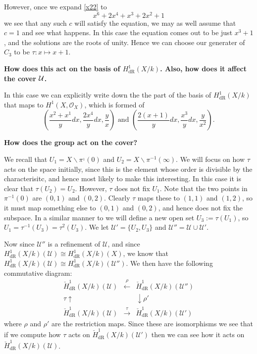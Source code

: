 \documentclass[draft, 11pt]{article} %
\theoremstyle{plain}
\theoremstyle{remark}
\newcommand{\cU}{{\mathcal U}}
\newcommand{\hone}{H^1(X,\mathcal{O}_X)}
\newcommand{\derhamhone}{H_{\text {dR}}^1(X/k)}
\newcommand{\cechderhamhone}{\check{H}_{\text {dR}}^1(X/k)}
\begin{document}
However, once we expand \eqref{x22} to 
\begin{equation}
x^6 + 2x^4 + x^3 + 2x^2 + 1
\end{equation}
we see that any such $c$ will satisfy the equation, we may as well assume that $c=1$ and see what happens.
In this case the equation comes out to be just $x^3+1$, and the solutions are the roots of unity.
Hence we can choose our generater of $C_3$ to be $\tau \colon x \mapsto x+1$.


{\bf How does this act on the basis of $\derhamhone$. Also, how does it affect the cover $\cal U$.}

In this case we can explicitly write down the the part of the basis of $\derhamhone$ that maps to $\hone$, which is formed of
\[
\left( \frac{x^2+x^1}{y} dx, \frac{2x^4}{y} dx, \frac{y}{x} \right) \text{ and } \left( \frac{2(x + 1)}{y} dx, \frac{x^3}{y} dx, \frac{y}{x^2} \right).
\]

{\bf How does the group act on the cover?}

We recall that $U_1 = X \backslash \pi^{_1}(0)$ and $U_2 = X \backslash \pi^{-1}(\infty)$.
We will focus on how $\tau$ acts on the space initially, since this is the element whose order is divisible by the characterisitc, and hence most likely to make this interesting.
In this case it is clear that $\tau(U_2) = U_2$.
However, $\tau$ does not fix $U_1$. 
Note that the two points in $\pi^{-1}(0)$ are $(0,1)$ and $(0,2)$.
Clearly $\tau$ maps these to $(1,1)$ and $(1,2)$, so it must map something else to $(0,1)$ and $(0,2)$, and hence does not fix the subspace.
In a similar manner to \cite{canonicalrepresentation} we will define a new open set $U_3 := \tau(U_1)$, so $U_1 = \tau^{-1}(U_3) = \tau^2(U_3)$.
We let $\mathcal U' = \{ U_2, U_3\}$ and $\mathcal U'' = \mathcal U \cup \mathcal U'$.

Now since $\mathcal U''$ is a refinement of $\mathcal U$, and since $\derhamhone (\mathcal U) \cong \derhamhone (X)$, we know that $\derhamhone (\mathcal U) \cong \derhamhone (\cU'')$.
We then have the following commutative diagram:
\[
\begin{array}{ccc}
\cechderhamhone (\cU) & \overset{\rho}{\leftarrow} & \cechderhamhone (\cU'') \\
\tau \uparrow & & \downarrow  \rho' \\
\cechderhamhone(\cU) & \overset{\tau}{\rightarrow} & \cechderhamhone(\cU')
\end{array}
\]
where $\rho$ and $\rho'$ are the restriction maps.
Since these are isomorphisms we see that if we compute how $\tau$ acts on $\cechderhamhone (\cU')$ then we can see how it acts on $\cechderhamhone(\cU)$.
\end{document}
